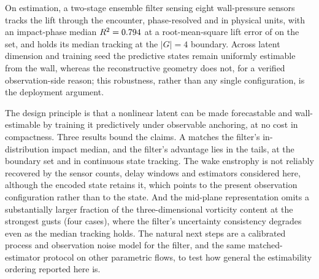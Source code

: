 On estimation, a two-stage ensemble filter sensing eight wall-pressure sensors tracks the lift through the encounter, phase-resolved and in physical units, with an impact-phase median $R^2 = 0.794$ at a root-mean-square lift error of \PoneTwoStageCovRmse{} on the \TestSplit{} set, and holds its median tracking at the $|G| = 4$ boundary. Across latent dimension and training seed the predictive states remain uniformly estimable from the wall, whereas the reconstructive geometry does not, for a verified observation-side reason; this robustness, rather than any single configuration, is the deployment argument.\re

The design principle is that a nonlinear latent can be made forecastable and wall-estimable by training it predictively under observable anchoring, at no cost in compactness. Three results bound the claims. A \StaticInv{} matches the filter's in-distribution impact median, and the filter's advantage lies in the tails, at the boundary set and in continuous state tracking. The wake enstrophy is not reliably recovered by the sensor counts, delay windows and estimators considered here, although the encoded state retains it, which points to the present observation configuration rather than to the state. And the mid-plane representation omits a substantially larger fraction of the three-dimensional vorticity content at the strongest gusts (four cases), where the filter's uncertainty consistency degrades even as the median tracking holds. The natural next steps are a calibrated process and observation noise model for the filter, and the same matched-estimator protocol on other parametric flows, to test how general the estimability ordering reported here is.\re

